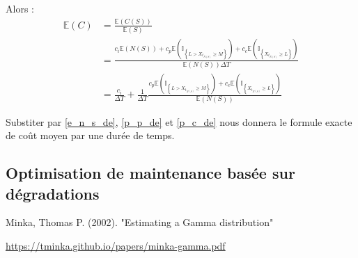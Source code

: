 \documentclass[10pt,a4paper]{article}
\begin{document}
Alors :
\begin{align*}
    \mathbb{E}\left( C \right) & = \frac{{\mathbb{E}\left( {C\left( S \right)} \right)}}{{\mathbb{E}\left( S \right)}} \\
    & = \frac{{{c_i}\mathbb{E}\left( {N\left( S \right)} \right) + {c_p}\mathbb{E}\left( {{\mathbb{I}_{\left\{ {L > {X_{{t_{N\left( S \right)}}}} \geqslant M} \right\}}}} \right) + {c_c}\mathbb{E}\left( {{\mathbb{I}_{\left\{ {{X_{{t_{N\left( S \right)}}}} \geqslant L} \right\}}}} \right)}}{{\mathbb{E}\left( {N\left( S \right)} \right)\Delta T}} \\
    & = \frac{{{c_i}}}{{\Delta T}} + \frac{1}{{\Delta T}}\frac{{{c_p}\mathbb{E}\left( {{\mathbb{I}_{\left\{ {L > {X_{{t_{N\left( S \right)}}}} \geqslant M} \right\}}}} \right) + {c_c}\mathbb{E}\left( {{\mathbb{I}_{\left\{ {{X_{{t_{N\left( S \right)}}}} \geqslant L} \right\}}}} \right)}}{{\mathbb{E}\left( {N\left( S \right)} \right)}}
\end{align*}

Substiter par \eqref{e_n_s_de}, \eqref{p_p_de} et \eqref{p_c_de} nous donnera le formule exacte de coût moyen par une durée de temps.
\subsection{Optimisation de maintenance basée sur dégradations}
\label{annexe:optim_degrad}


\begin{thebibliography}{9}
     Minka, Thomas P. (2002). "Estimating a Gamma distribution"

    \url{https://tminka.github.io/papers/minka-gamma.pdf}
\end{thebibliography}
\end{document}
